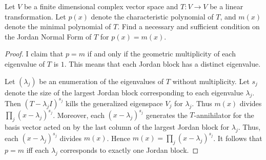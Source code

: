 \documentclass{article}
\begin{document}
%



 Let $V$ be a finite dimensional complex vector space and $T:V \to V$ be a linear transformation. Let $p(x)$ denote the characteristic polynomial of $T$, and $m(x)$ denote the minimal polynomial of $T$. Find a necessary and sufficient condition on the Jordan Normal Form of $T$ for $p(x) = m(x)$.
\begin{proof}
I claim that $p = m$ if and only if the geometric multiplicity of each eigenvalue of $T$ is $1$. This means that each Jordan block has a distinct eigenvalue.

Let $(\lambda_j)$ be an enumeration of the eigenvalues of $T$ without multiplicity. Let $s_j$ denote the size of the largest Jordan block corresponding to each eigenvalue $\lambda_j$. Then $(T - \lambda_j I)^{s_j}$ kills the generalized eigenspace $V_j$ for $\lambda_j$.   Thus $m(x)$ divides $\prod_j (x - \lambda_j)^{s_j}$.   Moreover, each $(x - \lambda_j)^{s_j}$ generates the $T$-annihilator for the basis vector acted on by the last column of the largest Jordan block for $\lambda_j$.   Thus, each $(x - \lambda_j)^{s_j}$ divides $m(x)$.  Hence $m(x) = \prod_j (x - \lambda_j)^{s_j}$.  It follows that $p = m$ iff each $\lambda_j$ corresponds to exactly one Jordan block.
\end{proof}
\end{document}
